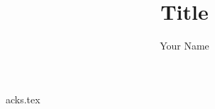 \documentclass[a4paper]{ustthesis}
\title{Title} %
\author{Your Name} %
\begin{document}


\dedication
{dedication.tex}
\enddedication
\newpage

\acknowledgments
{acks.tex}
\endacknowledgments
\newpage

\tableofcontents

\listoffigures

\listoftables


\end{document}
